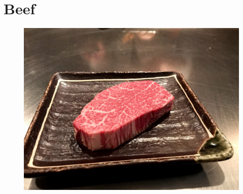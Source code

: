 \documentclass[11pt]{report}
\begin{document}
\chapter{Beef}
\begin{figure}[h]
\begin{center}
   \includegraphics[width=\linewidth]{images/IMG_1345.jpg}
\end{center}
\end{figure}
\newpage





\end{document}
